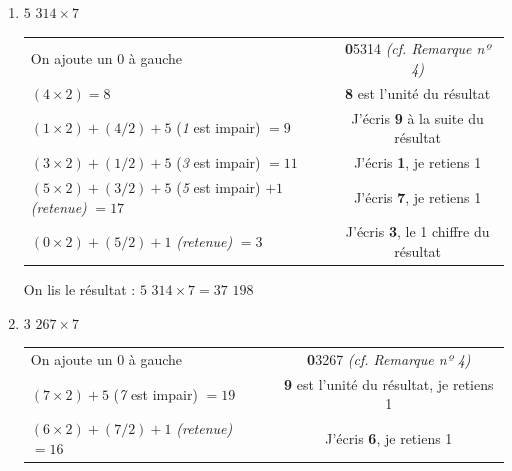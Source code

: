 \documentclass[a4paper]{article}
\begin{document}
\begin{small}
\begin{enumerate}

	\item $5$ $314 \times 7$
	
	\begin{tabular}{l|c}

		On ajoute un 0 à gauche & \textbf{0}5314 \textit{(cf. Remarque nº 4)}
		
		\tabularnewline
		
		$(4 \times 2) = 8$ & \textbf{8} est l'unité du résultat
		
		\tabularnewline
		
		$(1 \times 2) + (4 / 2) + 5$ (\textit{1} est impair) $= 9$ & J'écris \textbf{9} à la suite du résultat
		
		\tabularnewline
		
		$(3 \times 2) + (1 / 2) + 5$ (\textit{3} est impair) $= 11$ & J'écris \textbf{1}, je retiens 1
		
		\tabularnewline
		
		$(5 \times 2) + (3 / 2) + 5$ (\textit{5} est impair) $+ 1$ \textit{(retenue)} $= 17$ & J'écris \textbf{7}, je retiens 1
		
		\tabularnewline
		
		$(0 \times 2) + (5 / 2) + 1$ \textit{(retenue)} $= 3$ & J'écris \textbf{3}, le 1\up{er} chiffre du résultat
		
	\end{tabular}
	
	On lis le résultat : {\boldmath $5$ $314 \times 7 = 37$ $198$}\\	





	\item $3$ $267 \times 7$
	
	\begin{tabular}{l|c}

		On ajoute un 0 à gauche & \textbf{0}3267 \textit{(cf. Remarque nº 4)}
		
		\tabularnewline
		
		$(7 \times 2) + 5$ (\textit{7} est impair) $= 19$ & \textbf{9} est l'unité du résultat, je retiens 1
		
		\tabularnewline
		
		$(6 \times 2) + (7 / 2) + 1$ \textit{(retenue)} $= 16$ & J'écris \textbf{6}, je retiens 1
		
		\tabularnewline
		

\end{tabular}
\end{enumerate}
\end{small}
\end{document}
